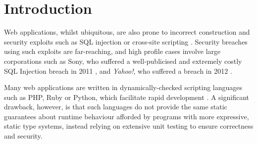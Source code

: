 \documentclass[preprint]{sigplanconf}
\begin{document}



\section{Introduction}
Web applications, whilst ubiquitous, are also prone to incorrect construction and security exploits such as SQL injection \cite{owasp:sqli} or cross-site scripting \cite{owasp:xss}. Security breaches using such exploits are far-reaching, and high profile cases involve large corporations such as Sony, who suffered a well-publicised and extremely costly SQL Injection breach in 2011 \cite{ieee:sony}, and \textit{Yahoo!}, who suffered a breach in 2012 \cite{imperva:yahoo}. 

Many web applications are written in dynamically-checked scripting languages such as PHP, Ruby or Python, which facilitate rapid development \cite{w3techs:webpls}. A significant drawback, however, is that such languages do not provide  the same static guarantees about runtime behaviour afforded by programs with more expressive, static type systems, instead relying on extensive unit testing to ensure correctness and security. 
\end{document}
